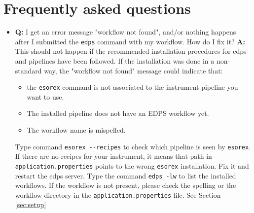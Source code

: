 
\section{Frequently asked questions}
\label{sec:trouble}


\begin{itemize}
    \item {\bf Q:} I get an error message "workflow not found",  and/or nothing happens after I submitted the {\tt edps} command with my workflow. How do I fix it? \newline
    {\bf A:}  This should not happen if the recommended installation procedures for edps and pipelines have been followed. If the installation was done in a non-standard way, the "workflow not found" message could indicate that:
    \begin{itemize}
        \item the {\tt esorex} command is not associated to the instrument pipeline you want to use. 
        \item The installed pipeline does not have an EDPS workflow yet.
        \item The workflow name is mispelled.
     \end{itemize}
  
        Type command \verb|esorex --recipes| to check which pipeline is seen by {\tt esorex}. If there are no recipes for your instrument, it means that path in {\tt application.properties} points to the wrong {\tt esorex} installation. Fix it and restart the edps server. Type the command {\tt edps -lw} to list the installed workflows. If the workflow is not present, please check the spelling or the workflow directory in the {\tt application.properties} file. See Section \ref{sec:setup}



\end{itemize}
